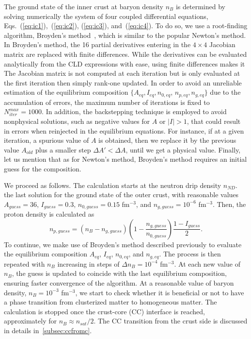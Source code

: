 The ground state of the inner crust at baryon density $n_B$ 
is determined by solving numerically the system of four coupled
differential equations, Eqs.~(\ref{eq:ic1}),~(\ref{eq:ic2}), (\ref{eq:ic3}),
and~(\ref{eq:ic4}). To do so, we use a root-finding algorithm, Broyden's
method~\cite{Broyden1965}, which is similar to the popular Newton's method. In 
Broyden's method, the 16 partial derivatives entering in the $4\times 4$ Jacobian 
matrix are replaced with finite differences. While the derivatives can be
evaluated analytically from the CLD expressions with ease, using finite
differences makes it  The Jacobian matrix 
is not computed at each iteration but is only evaluated at the first iteration 
then simply rank-one updated. In order to avoid an unreliable estimation of the
equilibrium composition $\{A_{eq},I_{eq},n_{0,eq}$, $n_{p,eq},n_{g,eq}\}$ due to
the accumulation of errors, the maximum number of iterations is fixed to
$N_{iter}^{max} = 1000$.
In addition, the backstepping technique is employed to avoid nonphysical solutions,
such as negative values for $A$ or $|I| > 1$, that could result in
errors when reinjected in the equilibrium equations. For instance, if at a given 
iteration, a spurious value of $A$ is obtained, then we replace it by the
previous value $A_{old}$ plus a smaller step $\Delta A' < \Delta A$, until we 
get a physical value. Finally, let us mention that as for Newton's 
method, Broyden's method requires an initial guess for the composition.

We proceed as follows. The calculation starts at the neutron drip density
$n_{ND}$.  the last 
  solution for the ground state of the outer crust, with reasonable values 
$A_{guess} = 36$, $I_{guess} = 0.3$, $n_{0,guess} = 0.15$ fm$^{-3}$, and 
$n_{g,guess} = 10^{-6}$ fm$^{-3}$. Then, the proton density is calculated
as
%
\begin{equation}
  n_{p,guess} =
  (n_B-n_{g,guess})\left(1-\frac{n_{g,guess}}{n_{0,guess}}\right)
  \frac{1-I_{guess}}{2}.
\end{equation}
%
To continue, we make use of Broyden's method described previously to evaluate 
the equilibrium composition $A_{eq}$, $I_{eq}$, $n_{0,eq}$, and $n_{g,eq}$. The
process is then repeated with $n_B$ increasing in steps of 
$\Delta n_B = 10^{-4}$ fm$^{-3}$. At each new value of $n_B$, the guess
is updated to coincide with the last equilibrium composition, ensuring faster
convergence of the algorithm. At a reasonable value of baryon density, $n_B =
10^{-3}$ fm$^{-3}$, we start to check whether it is beneficial or not to have a
phase transition from clusterized matter to homogeneous matter. The calculation 
is stopped once the crust-core (CC) interface is reached, approximately for $n_B
\approx n_{sat}/2$. The CC transition from the crust side is discussed 
in details in~\ref{subsec:ccfromc}.

